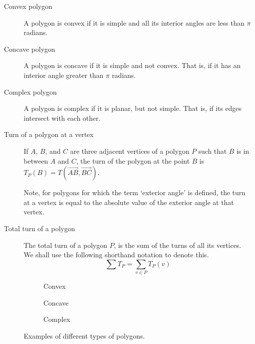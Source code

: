 \documentclass{article}
\newcommand{\vecl}{\overrightarrow} %
\begin{document}
\begin{description}
	\item[Convex polygon]
		A polygon is convex if it is simple and all its interior angles are less than \(\pi\) radians.

	\item[Concave polygon]
		A polygon is concave if it is simple and not convex. That is, if it has an interior angle greater than \(\pi\) radians.

	\item[Complex polygon]
		A polygon is complex if it is planar, but not simple. That is, if its edges intersect with each other.

	\item[Turn of a polygon at a vertex]
		If \(A\), \(B\), and \(C\) are three adjacent vertices of a polygon \(P\) such that \(B\) is in between \(A\) and \(C\), the turn of the polygon at the point \(B\) is \(T_P(B) = T(\vecl{AB}, \vecl{BC})\).

		Note, for polygons for which the term `exterior angle' is defined, the turn at a vertex is equal to the absolute value of the exterior angle at that vertex.

	\item[Total turn of a polygon]
		The total turn of a polygon \(P\), is the sum of the turns of all its vertices. We shall use the following shorthand notation to denote this.
		\begin{equation*}
			\sum T_P = \sum_{v \in P} T_P(v)
		\end{equation*}
\end{description}

\begin{figure}[htbp]
	\centering
	\begin{subfigure}{0.25\textwidth}
		\centering
		\caption{Convex}
	\end{subfigure}%
	\begin{subfigure}{0.25\textwidth}
		\centering
		\caption{Concave}
	\end{subfigure}%
	\begin{subfigure}{0.25\textwidth}
		\centering
		\caption{Complex}
	\end{subfigure}%
	\caption{Examples of different types of polygons.}
	\label{}
\end{figure}
\end{document}
